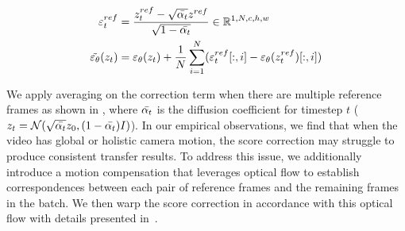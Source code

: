 \begin{align}
\varepsilon_t^{ref} &= \frac{z^{ref}_t - \sqrt{\Bar{\alpha_t}}z^{ref}}{\sqrt{1 - \Bar{\alpha_t}}} \in \mathbb{R}^{1,N,c,h,w}\label{eq.1} \\
\tilde{\varepsilon_\theta}(z_t) &= \varepsilon_\theta(z_t) + \frac{1}{N} \sum_{i=1}^N (\varepsilon_t^{ref}[:, i] - \varepsilon_\theta(z_t^{ref})[:, i])\label{eq.lvsc}
\end{align}

We apply averaging on the correction term when there are multiple reference frames as shown in , where $\Bar{\alpha_t}$ is the diffusion coefficient for timestep $t$ (\ie $z_t = \mathcal{N}(\sqrt{\Bar{\alpha_t}}z_0, (1 - \Bar{\alpha_t})I)$). In our empirical observations, we find that when the video has global or holistic camera motion, the score correction may struggle to produce consistent transfer results. To address this issue, we additionally introduce a motion compensation that leverages optical flow to establish correspondences between each pair of reference frames and the remaining frames in the batch. We then warp the score correction in accordance with this optical flow with details presented in~.

